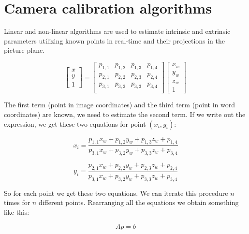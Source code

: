 \documentclass{article}
\begin{document}
\newpage

\section*{Camera calibration algorithms}

Linear and non-linear algorithms are used to estimate intrinsic and extrinsic parameters utilizing known points in real-time and their projections in the picture plane.

\begin{equation*}
    \begin{bmatrix}
        x \\ y \\ 1
    \end{bmatrix} = \begin{bmatrix}
        p_{1, 1} & p_{1, 2} & p_{1, 3} & 
        p_{1, 4} \\
        p_{2, 1} & p_{2, 2} & p_{2, 3} & 
        p_{2, 4} \\
        p_{3, 1} & p_{3, 2} & p_{3, 3} & 
        p_{3, 4} \\
    \end{bmatrix}
    \begin{bmatrix}
        x_w \\ y_w \\ z_w \\ 1
    \end{bmatrix}
\end{equation*}

The first term (point in image coordinates) and the third term (point in word coordinates) are known, we need to estimate the second term. If we write out the expression, we get these two equations for point $(x_i, y_i)$:

\begin{equation*}
    x_i = \frac{p_{1,1} x_w + p_{1,2} y_w + p_{1,3} z_w + p_{1,4}}{p_{3,1} x_w + p_{3,2} y_w + p_{3,3} z_w + p_{3,4}}
\end{equation*}

\begin{equation*}
    y_i = \frac{p_{2,1} x_w + p_{2,2} y_w + p_{2,3} z_w + p_{2,4}}{p_{3,1} x_w + p_{3,2} y_w + p_{3,3} z_w + p_{3,4}}
\end{equation*}

So for each point we get these two equations. We can iterate this procedure $n$ times for $n$ different points. Rearranging all the equations we obtain something like this:

\begin{equation*}
    Ap = b
\end{equation*}
\end{document}
